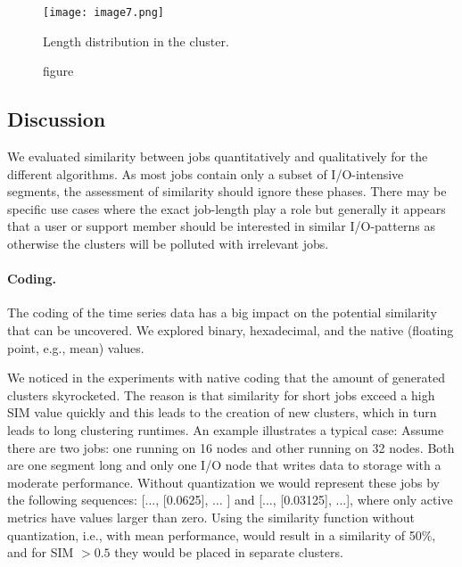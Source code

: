 \documentclass{jhps}
\begin{document}
\begin{minipage}{\textwidth}
\medskip

\begingroup
  \begin{subfigure}{\textwidth}
  \centering
  \texttt{[image: image7.png]}
  \caption{figure}{Length distribution in the cluster.}
  \label{fig:use_case:pm_quant:length}
  \end{subfigure}
\endgroup

\label{fig:use_case:pm_quant}
\end{minipage}



\subsection{Discussion}
We evaluated similarity between jobs quantitatively and qualitatively for the different algorithms.
As most jobs contain only a subset of I/O-intensive segments, the assessment of similarity should ignore these phases.
There may be specific use cases where the exact job-length play a role but generally it appears that a user or support member should be interested in similar I/O-patterns as otherwise the clusters will be polluted with  irrelevant jobs.

\paragraph{Coding.} The coding of the time series data has a big impact on the potential similarity that can be uncovered.
We explored binary, hexadecimal, and the native (floating point, e.g., mean) values.

We noticed in the experiments with native coding that the amount of generated clusters skyrocketed.
The reason is that similarity for short jobs exceed a high SIM value quickly and this leads to the creation of new clusters, which in turn leads to long clustering runtimes.
An example illustrates a typical case:
Assume there are two jobs: one running on 16 nodes and other running on 32 nodes.
Both are one segment long and only one I/O node that writes data to storage with a moderate performance.
Without quantization we would represent these jobs by the following sequences:  [..., [0.0625], $ \ldots $ ] and [..., [0.03125], ...], where only active metrics have values larger than zero.
Using the similarity function without quantization, i.e., with mean performance, would result in a similarity of 50$\%$, and for SIM $>0.5$ they would be placed in separate clusters.
\end{document}
